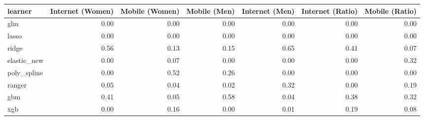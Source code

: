 \begin{table}[ht]
\centering
\begin{tabular}{lrrrrrr}
  \toprule
learner & Internet (Women) & Mobile (Women) & Mobile (Men) & Internet (Men) & Internet (Ratio) & Mobile (Ratio) \\ 
  \midrule
glm & 0.00 & 0.00 & 0.00 & 0.00 & 0.00 & 0.00 \\ 
  lasso & 0.00 & 0.00 & 0.00 & 0.00 & 0.00 & 0.00 \\ 
  ridge & 0.56 & 0.13 & 0.15 & 0.65 & 0.41 & 0.07 \\ 
  elastic\_new & 0.00 & 0.07 & 0.00 & 0.00 & 0.00 & 0.32 \\ 
  poly\_spline & 0.00 & 0.52 & 0.26 & 0.00 & 0.00 & 0.00 \\ 
  ranger & 0.05 & 0.04 & 0.02 & 0.32 & 0.00 & 0.19 \\ 
  gbm & 0.41 & 0.05 & 0.58 & 0.04 & 0.38 & 0.32 \\ 
  xgb & 0.00 & 0.16 & 0.00 & 0.01 & 0.19 & 0.08 \\ 
   \bottomrule
\end{tabular}
\end{table}
